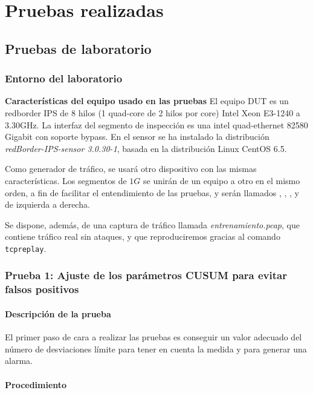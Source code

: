 \section{Pruebas realizadas}
\subsection{Pruebas de laboratorio}
\subsubsection{Entorno del laboratorio}

\textbf{Características del equipo usado en las pruebas}
El equipo \gls{DUT} es un redborder IPS de 8 hilos (1 quad-core de 2 hilos por core) Intel Xeon E3-1240 a 3.30GHz. La 
interfaz del segmento de inspección es una intel quad-ethernet 82580 Gigabit con soporte bypass. En el sensor se ha 
instalado la distribución \emph{redBorder-IPS-sensor 3.0.30-1}, basada en la distribución Linux CentOS 6.5.

Como generador de tráfico, se usará otro dispositivo con las mismas características. Los segmentos de $1G$ se unirán de 
un equipo a otro en el mismo orden, a fin de facilitar el entendimiento de las pruebas, y serán llamados 
, , , y  de izquierda a derecha.

Se dispone, además, de una captura de tráfico llamada \emph{entrenamiento.pcap}, que contiene tráfico real sin ataques,
y que reproduciremos gracias al comando \texttt{tcpreplay}.

\subsubsection{Prueba 1: Ajuste de los parámetros CUSUM para evitar falsos positivos}
\paragraph{Descripción de la prueba}\mbox{}

El primer paso de cara a realizar las pruebas es conseguir un valor adecuado del número de desviaciones límite
para tener en cuenta la medida y para generar una alarma.

\paragraph{Procedimiento}\mbox{}

